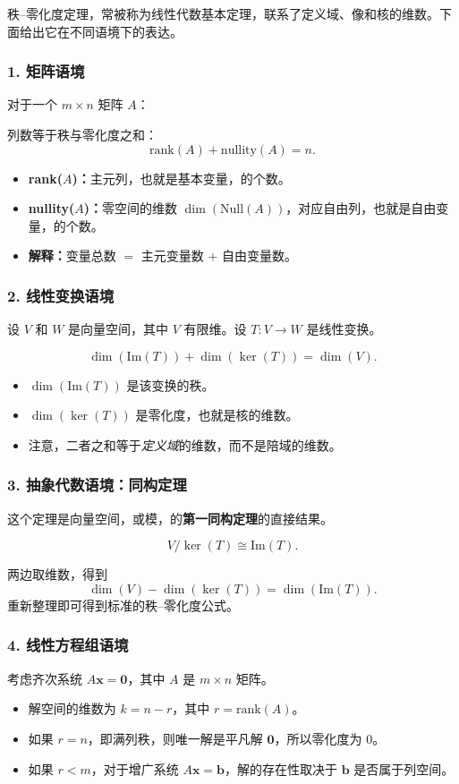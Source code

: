 秩--零化度定理，常被称为线性代数基本定理，联系了定义域、像和核的维数。下面给出它在不同语境下的表达。

\subsubsection{1. 矩阵语境}
对于一个 $m\times n$ 矩阵 $A$：
\begin{theorem}
列数等于秩与零化度之和：
\[ \text{rank}(A)+\text{nullity}(A)=n. \]
\end{theorem}
\begin{itemize}
    \item \textbf{rank($A$)：}主元列，也就是基本变量，的个数。
    \item \textbf{nullity($A$)：}零空间的维数 $\dim(\text{Null}(A))$，对应自由列，也就是自由变量，的个数。
    \item \textbf{解释：}变量总数 $=$ 主元变量数 $+$ 自由变量数。
\end{itemize}

\subsubsection{2. 线性变换语境}
设 $V$ 和 $W$ 是向量空间，其中 $V$ 有限维。设 $T:V\to W$ 是线性变换。
\begin{theorem}
\[ \dim(\text{Im}(T))+\dim(\ker(T))=\dim(V). \]
\end{theorem}
\begin{itemize}
    \item $\dim(\text{Im}(T))$ 是该变换的秩。
    \item $\dim(\ker(T))$ 是零化度，也就是核的维数。
    \item 注意，二者之和等于\textit{定义域}的维数，而不是陪域的维数。
\end{itemize}

\subsubsection{3. 抽象代数语境：同构定理}
这个定理是向量空间，或模，的\textbf{第一同构定理}的直接结果。
\begin{theorem}
\[ V/\ker(T)\cong \text{Im}(T). \]
\end{theorem}
两边取维数，得到
\[ \dim(V)-\dim(\ker(T))=\dim(\text{Im}(T)). \]
重新整理即可得到标准的秩--零化度公式。

\subsubsection{4. 线性方程组语境}
考虑齐次系统 $A\mathbf{x}=\mathbf{0}$，其中 $A$ 是 $m\times n$ 矩阵。
\begin{itemize}
    \item 解空间的维数为 $k=n-r$，其中 $r=\text{rank}(A)$。
    \item 如果 $r=n$，即满列秩，则唯一解是平凡解 $\mathbf{0}$，所以零化度为 $0$。
    \item 如果 $r<m$，对于增广系统 $A\mathbf{x}=\mathbf{b}$，解的存在性取决于 $\mathbf{b}$ 是否属于列空间。
\end{itemize}

